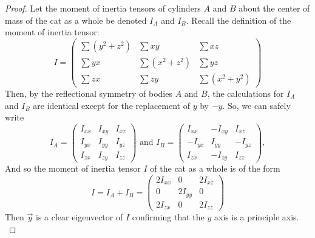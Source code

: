 \documentclass[12]{amsart}
\theoremstyle{definition}
\begin{document}
    \begin{proof}
        Let the moment of inertia tensors of cylinders $A$ and $B$ about the center of mass of the cat as a whole be denoted $I_A$ and $I_B$. Recall the definition of the moment of inertia tensor:        
        \begin{equation*}
            I =
            \begin{pmatrix}
                \sum(y^2+z^2) & \sum xy       & \sum xz     \\
                \sum yx      & \sum(x^2+z^2) & \sum yz      \\
                \sum zx      & \sum zy       & \sum(x^2+y^2)
            \end{pmatrix}
        \end{equation*}
        Then, by the reflectional symmetry of bodies $A$ and $B$, the calculations for $I_A$ and $I_B$ are identical except for the replacement of $y$ by $-y$. So, we can safely write
        \begin{equation*}
            I_A = 
            \begin{pmatrix}
                I_{xx} & I_{xy} & I_{xz} \\
                I_{yx} & I_{yy} & I_{yz} \\
                I_{zx} & I_{zy} & I_{zz}
            \end{pmatrix} \text{ and }
            I_B = 
            \begin{pmatrix}
                I_{xx} & -I_{xy} & I_{xz} \\
                -I_{yx} & I_{yy} & -I_{yz} \\
                I_{zx} & -I_{zy} & I_{zz}
            \end{pmatrix},
        \end{equation*}
        And so the moment of inertia tensor $I$ of the cat as a whole is of the form
    \begin{equation*}
        I = I_A + I_B = 
            \begin{pmatrix}
                2I_{xx} & 0       & 2I_{xz} \\
                0       & 2I_{yy} & 0 \\
                2I_{zx} & 0       & 2I_{zz}
            \end{pmatrix}
    \end{equation*}
    Then $\vec{y}$ is a clear eigenvector of $I$ confirming that the $y$ axis is a principle axis. 
    \label{claim:principle}
    \end{proof}    
\end{document}
